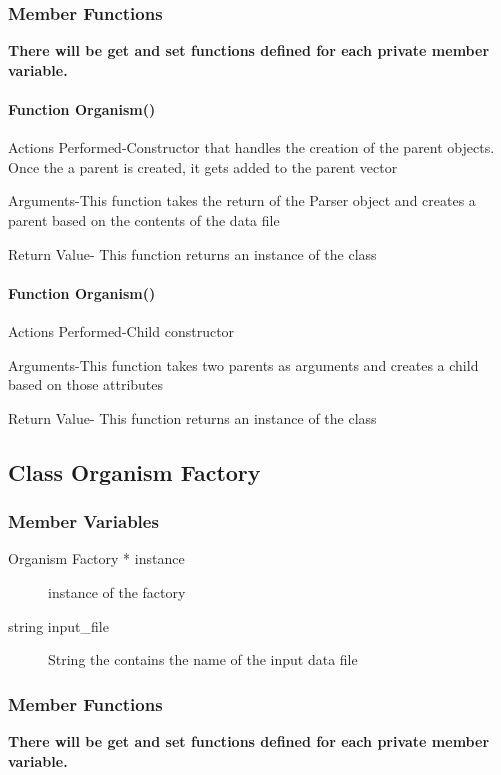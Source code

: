 \documentclass{article}
\begin{document}
\subsubsection{Member Functions}
\textbf{There will be get and set functions defined for each private member variable.}

\paragraph{Function Organism()}
Actions Performed-Constructor that handles the creation of the parent objects. Once the a parent is created, it gets added to the parent vector
                 
Arguments-This function takes the return of the Parser object and creates a parent based on the contents of the data file
                    
Return Value- This function returns an instance of the class

\paragraph{Function Organism()}
Actions Performed-Child constructor
                 
Arguments-This function takes two parents as arguments and creates a child based on those attributes
                    
Return Value- This function returns an instance of the class

\newpage
\subsection{Class Organism Factory}
\subsubsection{Member Variables}
\begin{description}
\item[Organism Factory * instance] instance of the factory
\item[string input\_file] String the contains the name of the input data file
\end{description}
\subsubsection{Member Functions}
\textbf{There will be get and set functions defined for each private member variable.}
\end{document}
